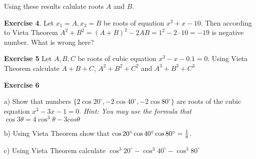   Using these results calulate roots $A$ and $B$.



\medskip

{\bf Exercise 4}. Let $x_1=A,x_2=B$ be roots of  equation $x^2+x-10$.
Then according to Vieta Theorem $A^2+B^2=(A+B)^2-2AB=1^2-2\cdot 10=-19$ is negative number.
 What is wrong here?

\medskip

{\bf Exercise 5}  Let $A,B,C$ be roots of cubic equation $x^3-x-0.1=0$.
Using Vieta Theorem calculate $A+B+C$, $A^2+B^2+C^2$ and $A^3+B^3+C^3$
\medskip

{\bf Exercise 6}

a) Show that numbers $\{2\cos 20^\circ, -2\cos 40^\circ, -2\cos 80^\circ\}$ are roots of the cubic equation
  $x^3-3x-1=0$.
{\it Hint: You may use the formula that $\cos 3\theta=4\cos^3\theta-3cos\theta$}

\smallskip

b) Using Vieta Theorem show that $\cos 20^\circ \cos 40^\circ \cos 80^\circ={1\over 8}$.

  c) Using Vieta Theorem calculate  $\cos^3 20^\circ -\cos^3 40^\circ- \cos^3 80^\circ$




\bye
